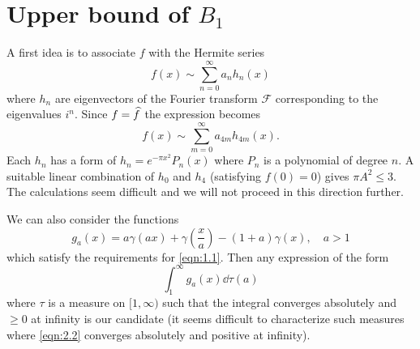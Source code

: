 \section{Upper bound of $B_{1}$}

A first idea is to associate $f$ with the Hermite series
\[
    f(x) \sim \sum_{n = 0}^{\infty}a_n h_n(x)
\]
where $h_n$ are eigenvectors of the Fourier transform $\mathcal{F}$ corresponding to the eigenvalues $i^n$.
Since $f = \widehat{f}$ the expression becomes
\[
    f(x) \sim \sum_{m=0}^{\infty} a_{4m} h_{4m}(x).
\]
Each $h_{n}$ has a form of $h_{n} = e^{-\pi x^2} P_{n}(x)$ where $P_{n}$ is a polynomial of degree $n$.
A suitable linear combination of $h_{0}$ and $h_{4}$ (satisfying $f(0) = 0$) gives $\pi A^{2} \leq 3$.
The calculations seem difficult and we will not proceed in this direction further.

We can also consider the functions
\begin{equation}
    \label{eqn:2.1}
    g_{a}(x) = a \gamma(ax) + \gamma\left(\frac{x}{a}\right) - (1 + a) \gamma(x),\quad  a > 1
\end{equation}
which satisfy the requirements for \eqref{eqn:1.1}.
Then any expression of the form
\begin{equation}
    \label{eqn:2.2}
    \int_{1}^{\infty} g_{a}(x) \dd \tau(a)
\end{equation}
where $\tau$ is a measure on $[1, \infty)$ such that the integral converges absolutely and $\geq 0$ at infinity is our candidate (it seems difficult to characterize such measures where \eqref{eqn:2.2} converges absolutely and positive at infinity).

